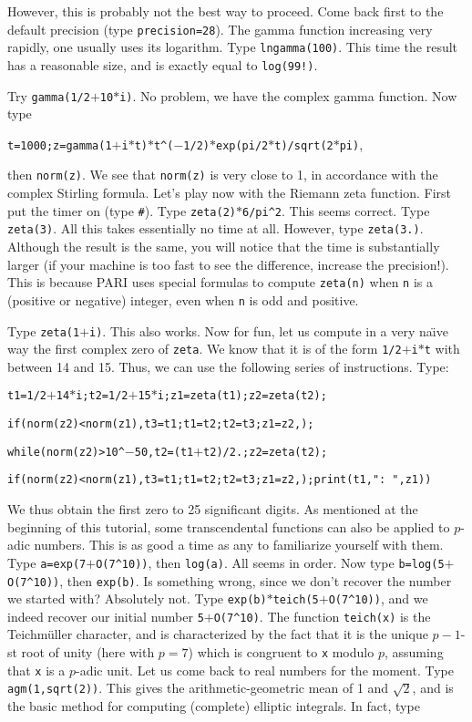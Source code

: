 However, this is probably not the best way to proceed. Come back first to
the default precision (type {\tt\bs precision=28}). The gamma function 
increasing very rapidly, one usually uses its logarithm. Type 
{\tt lngamma(100)}. This time the result has a reasonable size, and is
exactly equal to {\tt log(99!)}.

Try {\tt gamma(1/2$+$10$*$i)}. No problem, we have the complex gamma function.
Now type 

{\tt t=1000;z=gamma(1$+$i$*$t)$*$t\^{}($-$1/2)$*$exp(pi/2$*$t)/sqrt(2$*$pi)},

then {\tt norm(z)}. We see that {\tt norm(z)} is very close to 1, in accordance
with the complex Stirling formula.
\smallskip
Let's play now with the Riemann zeta function. First put the timer on (type
{\tt \#}). Type {\tt zeta(2)$*$6/pi\^{}2}. This seems correct. Type 
{\tt zeta(3)}. All this takes essentially no time at all. However, type
{\tt zeta(3.)}. Although the result is the same, you will notice that the
time is substantially larger (if your machine is too fast to see the 
difference, increase the precision!). This is because PARI uses special 
formulas to compute {\tt zeta(n)} when {\tt n} is a (positive or negative)
integer, even when {\tt n} is odd and positive.

Type {\tt zeta(1$+$i)}. This also works. Now for fun, let us compute in a very
na\"\i ve way the first complex zero of {\tt zeta}. We know that it is of the
form {\tt 1/2$+$i$*$t} with between 14 and 15. Thus, we can use the following
series of instructions. Type:

\centerline{\tt t1=1/2$+$14$*$i;t2=1/2$+$15$*$i;z1=zeta(t1);z2=zeta(t2);}

\centerline{\tt if(norm(z2)<norm(z1),t3=t1;t1=t2;t2=t3;z1=z2,);}

\centerline{\tt while(norm(z2)>10\^{}$-$50,t2=(t1$+$t2)/2.;z2=zeta(t2);\bs}

\centerline{\tt if(norm(z2)<norm(z1),t3=t1;t1=t2;t2=t3;z1=z2,);print(t1,": ",z1))}

We thus obtain the first zero to 25 significant digits. 
\medskip
As mentioned at the beginning of this tutorial, some transcendental functions
can also be applied to $p$-adic numbers. This is as good a time as any to
familiarize yourself with them. Type {\tt a=exp(7$+$O(7\^{}10))}, then
{\tt log(a)}. All seems in order. Now type {\tt b=log(5$+$O(7\^{}10))}, then
{\tt exp(b)}. Is something wrong, since we don't recover the number we
started with? Absolutely not. Type {\tt exp(b)$*$teich(5$+$O(7\^{}10))}, and
we indeed recover our initial number {\tt 5$+$O(7\^{}10)}. The function
{\tt teich(x)} is the Teichm\"uller character, and is characterized by the
fact that it is the unique $p-1$-st root of unity (here with $p=7$) which
is congruent to {\tt x} modulo $p$, assuming that {\tt x} is a $p$-adic
unit. 
\smallskip
Let us come back to real numbers for the moment. Type {\tt agm(1,sqrt(2))}. 
This gives the arithmetic-geometric mean of 1 
and $\sqrt2$, and is the basic method for computing (complete) elliptic
integrals. In fact, type 


